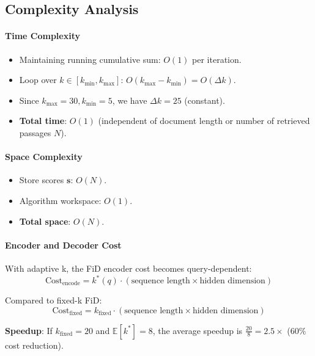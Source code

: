 \subsection*{Complexity Analysis}

\paragraph{Time Complexity}
\begin{itemize}
\item Maintaining running cumulative sum: $O(1)$ per iteration.
\item Loop over $k \in [k_{\min}, k_{\max}]$: $O(k_{\max} - k_{\min}) = O(\Delta k)$.
\item Since $k_{\max} = 30, k_{\min} = 5$, we have $\Delta k = 25$ (constant).
\item \textbf{Total time}: $O(1)$ (independent of document length or number of retrieved passages $N$).
\end{itemize}

\paragraph{Space Complexity}
\begin{itemize}
\item Store scores $\mathbf{s}$: $O(N)$.
\item Algorithm workspace: $O(1)$.
\item \textbf{Total space}: $O(N)$.
\end{itemize}

\paragraph{Encoder and Decoder Cost}

With adaptive k, the FiD encoder cost becomes query-dependent:
\begin{equation}
\text{Cost}_{\text{encode}} = k^*(q) \cdot (\text{sequence length} \times \text{hidden dimension})
\end{equation}

Compared to fixed-k FiD:
\begin{equation}
\text{Cost}_{\text{fixed}} = k_{\text{fixed}} \cdot (\text{sequence length} \times \text{hidden dimension})
\end{equation}

\textbf{Speedup}: If $k_{\text{fixed}} = 20$ and $\mathbb{E}[k^*] = 8$, the average speedup is $\frac{20}{8} = 2.5 \times$ (60\% cost reduction).

